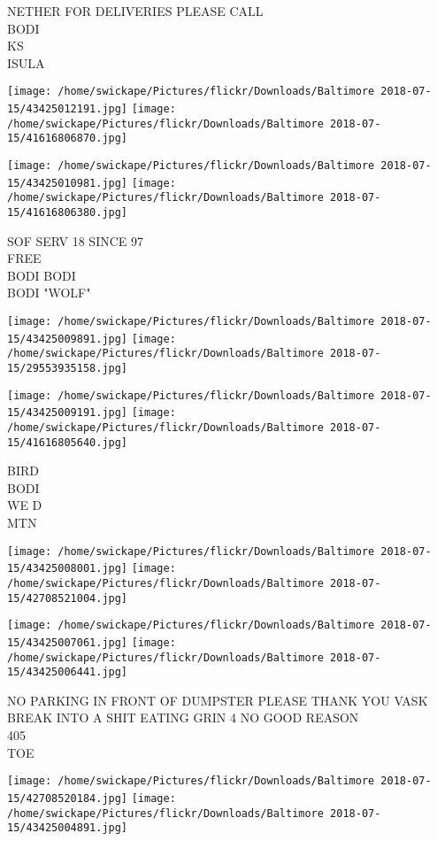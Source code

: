 \documentclass[10pt,letterpaper]{article}
\begin{document}
NETHER FOR DELIVERIES PLEASE CALL\\
BODI\\
KS\\
ISULA
\pagebreak

\texttt{[image: /home/swickape/Pictures/flickr/Downloads/Baltimore 2018-07-15/43425012191.jpg]}
\texttt{[image: /home/swickape/Pictures/flickr/Downloads/Baltimore 2018-07-15/41616806870.jpg]}

\texttt{[image: /home/swickape/Pictures/flickr/Downloads/Baltimore 2018-07-15/43425010981.jpg]}
\texttt{[image: /home/swickape/Pictures/flickr/Downloads/Baltimore 2018-07-15/41616806380.jpg]}

SOF SERV 18 SINCE 97\\
FREE\\
BODI BODI\\
BODI "WOLF"
\pagebreak

\texttt{[image: /home/swickape/Pictures/flickr/Downloads/Baltimore 2018-07-15/43425009891.jpg]}
\texttt{[image: /home/swickape/Pictures/flickr/Downloads/Baltimore 2018-07-15/29553935158.jpg]}

\texttt{[image: /home/swickape/Pictures/flickr/Downloads/Baltimore 2018-07-15/43425009191.jpg]}
\texttt{[image: /home/swickape/Pictures/flickr/Downloads/Baltimore 2018-07-15/41616805640.jpg]}

BIRD\\
BODI\\
WE D\\
MTN
\pagebreak

\texttt{[image: /home/swickape/Pictures/flickr/Downloads/Baltimore 2018-07-15/43425008001.jpg]}
\texttt{[image: /home/swickape/Pictures/flickr/Downloads/Baltimore 2018-07-15/42708521004.jpg]}

\texttt{[image: /home/swickape/Pictures/flickr/Downloads/Baltimore 2018-07-15/43425007061.jpg]}
\texttt{[image: /home/swickape/Pictures/flickr/Downloads/Baltimore 2018-07-15/43425006441.jpg]}

NO PARKING IN FRONT OF DUMPSTER PLEASE THANK YOU VASK\\
BREAK INTO A SHIT EATING GRIN 4 NO GOOD REASON\\
405\\
TOE
\pagebreak

\texttt{[image: /home/swickape/Pictures/flickr/Downloads/Baltimore 2018-07-15/42708520184.jpg]}
\texttt{[image: /home/swickape/Pictures/flickr/Downloads/Baltimore 2018-07-15/43425004891.jpg]}
\end{document}
